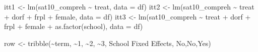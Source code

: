 \documentclass[
  letterpaper,
  DIV=11,
  numbers=noendperiod]{scrartcl}
\newenvironment{Shaded}{\begin{snugshade}}{\end{snugshade}}
\newcommand{\AttributeTok}[1]{\textcolor[rgb]{0.40,0.45,0.13}{#1}}
\newcommand{\FunctionTok}[1]{\textcolor[rgb]{0.28,0.35,0.67}{#1}}
\newcommand{\NormalTok}[1]{\textcolor[rgb]{0.00,0.23,0.31}{#1}}
\newcommand{\OtherTok}[1]{\textcolor[rgb]{0.00,0.23,0.31}{#1}}
\newcommand{\SpecialCharTok}[1]{\textcolor[rgb]{0.37,0.37,0.37}{#1}}
\newcommand{\StringTok}[1]{\textcolor[rgb]{0.13,0.47,0.30}{#1}}
\begin{document}
\begin{Shaded}
\begin{Highlighting}[]
\NormalTok{itt1 }\OtherTok{\textless{}{-}} \FunctionTok{lm}\NormalTok{(sat10\_compreh }\SpecialCharTok{\textasciitilde{}}\NormalTok{ treat, }\AttributeTok{data =}\NormalTok{ df)}
\NormalTok{itt2 }\OtherTok{\textless{}{-}} \FunctionTok{lm}\NormalTok{(sat10\_compreh }\SpecialCharTok{\textasciitilde{}}\NormalTok{ treat }\SpecialCharTok{+}\NormalTok{ dorf }\SpecialCharTok{+}\NormalTok{ frpl }\SpecialCharTok{+}\NormalTok{ female, }\AttributeTok{data =}\NormalTok{ df)}
\NormalTok{itt3 }\OtherTok{\textless{}{-}} \FunctionTok{lm}\NormalTok{(sat10\_compreh }\SpecialCharTok{\textasciitilde{}}\NormalTok{ treat }\SpecialCharTok{+}\NormalTok{ dorf }\SpecialCharTok{+}\NormalTok{ frpl }\SpecialCharTok{+}\NormalTok{ female }\SpecialCharTok{+} \FunctionTok{as.factor}\NormalTok{(school), }\AttributeTok{data =}\NormalTok{ df)}

\NormalTok{row }\OtherTok{\textless{}{-}} \FunctionTok{tribble}\NormalTok{(}\SpecialCharTok{\textasciitilde{}}\NormalTok{term, }\SpecialCharTok{\textasciitilde{}}\StringTok{\textquotesingle{}1\textquotesingle{}}\NormalTok{, }\SpecialCharTok{\textasciitilde{}}\StringTok{\textquotesingle{}2\textquotesingle{}}\NormalTok{, }\SpecialCharTok{\textasciitilde{}}\StringTok{\textquotesingle{}3\textquotesingle{}}\NormalTok{,}
               \StringTok{\textquotesingle{}School Fixed Effects\textquotesingle{}}\NormalTok{, }\StringTok{\textquotesingle{}No\textquotesingle{}}\NormalTok{,}\StringTok{\textquotesingle{}No\textquotesingle{}}\NormalTok{,}\StringTok{\textquotesingle{}Yes\textquotesingle{}}\NormalTok{)}



\end{Highlighting}
\end{Shaded}
\end{document}
